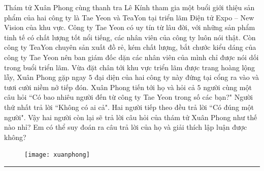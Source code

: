 \begin{multicols}{2}
	Thám tử Xuân Phong cùng thanh tra Lê Kính tham gia một buổi giới thiệu sản phẩm của hai công ty là Tae Yeon và TeaYon tại triển lãm Điện tử Expo -- New Vision của khu vực. Công ty  Tae Yeon có uy tín từ lâu đời, với những sản phẩm tinh tế có chất lượng tốt nổi tiếng,  các nhân viên của công ty luôn nói thật. Còn công ty TeaYon chuyên sản xuất đồ rẻ, kém chất lượng, bắt chước kiểu dáng của công ty Tae Yeon nên ban giám đốc dặn các nhân viên của mình chỉ được nói dối trong buổi triển lãm. 
	\vskip 0.1cm
	Vừa đặt chân tới khu vực triển lãm được trang hoàng lộng lẫy, Xuân Phong gặp ngay $5$ đại diện  của hai công ty này đứng tại cổng ra vào và tươi cười niềm nở tiếp đón. Xuân Phong tiến tới họ và hỏi cả $5$ người cùng một câu hỏi ``Có bao nhiêu người đến từ công ty Tae Yeon trong số các bạn?" 
	\vskip 0.1cm
	Người thứ nhất trả lời ``Không có ai cả". Hai người tiếp theo đều trả lời ``Có đúng một người". 
	\vskip 0.1cm
	Vậy hai người còn lại sẽ trả lời câu hỏi của thám tử Xuân Phong như thế nào nhỉ? Em có thể suy đoán ra câu trả lời của họ và giải thích lập luận được không?
	\begin{figure}[H]
		\centering
		\vspace*{-5pt}
		\captionsetup{labelformat= empty, justification=centering}
		\texttt{[image: xuanphong]}
		\vspace*{-5pt}
	\end{figure}
%	
\end{multicols}
\vspace*{-10pt}
{\color{toancuabi}\rule{1\linewidth}{0.1pt}}
\begingroup
